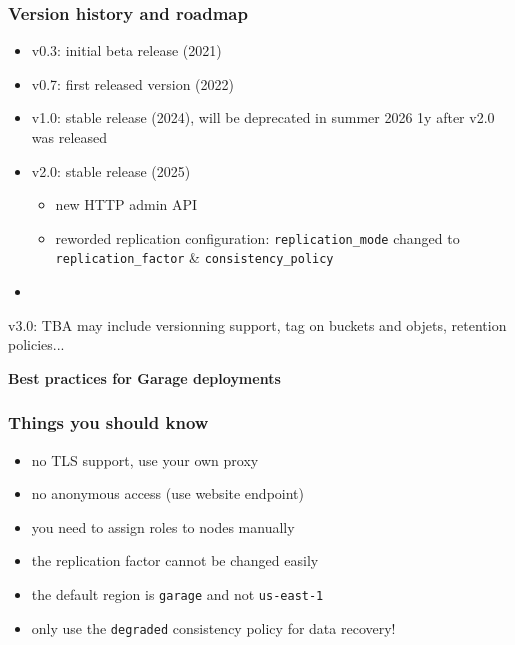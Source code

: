 \documentclass[aspectratio=169]{beamer}
\begin{document}
\begin{frame}
	\frametitle{Version history and roadmap}
	\begin{itemize}
		\item v0.3: initial beta release (2021)
		\item v0.7: first released version (2022)
		\item v1.0: stable release (2024), will be deprecated in summer 2026 1y after v2.0 was released
        \item v2.0: stable release (2025)
        \begin{itemize}
        \item new HTTP admin API
        \item reworded replication configuration: \texttt{replication\_mode} changed to \texttt{replication\_factor} \& \texttt{consistency\_policy}
        \end{itemize}
        \item
	\end{itemize}
	\begin{center}
	    v3.0: TBA may include versionning support, tag on buckets and objets, retention policies...
	\end{center}
\end{frame}

\begin{frame}
	\centering
	{\large\bf Best practices for Garage deployments}
\end{frame}

\begin{frame}
	\frametitle{Things you should know}
	\begin{itemize}
		\item no TLS support, use your own proxy
		\item no anonymous access (use website endpoint)
		\item you need to assign roles to nodes manually
        \item the replication factor cannot be changed easily
        \item the default region is \texttt{garage} and not \texttt{us-east-1}
        \item only use the \texttt{degraded} consistency policy for data recovery!
	\end{itemize}
\end{frame}
\end{document}
